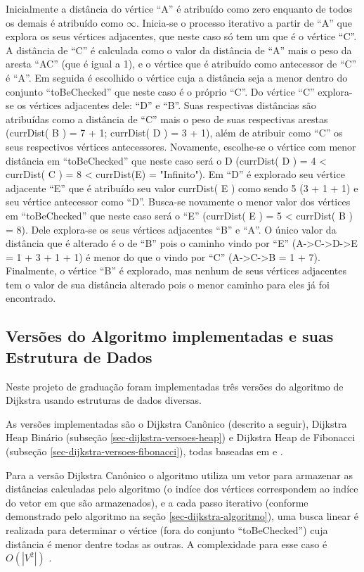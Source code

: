 Inicialmente a distância do vértice ``A'' é atribuído como zero enquanto de todos os demais é atribuído como $\infty$. Inicia-se o processo iterativo a partir de ``A'' que explora os seus vértices adjacentes, que neste caso só tem um que é o vértice ``C''. A distância de ``C'' é calculada como o valor da distância de ``A'' mais o peso da aresta ``AC'' (que é igual a 1), e o vértice que é atribuído como antecessor de ``C'' é ``A''. Em seguida é escolhido o vértice cuja a distância seja a menor dentro do conjunto ``toBeChecked'' que neste caso é o próprio ``C''. Do vértice ``C'' explora-se os vértices adjacentes dele: ``D'' e ``B''. Suas respectivas distâncias são atribuídas como a distância de ``C'' mais o peso de suas respectivas arestas (currDist( B ) = 7 + 1; currDist( D ) = 3 + 1), além de atribuir como ``C'' os seus respectivos vértices antecessores. Novamente, escolhe-se o vértice com menor distância em ``toBeChecked'' que neste caso será o D (currDist( D ) = 4 < currDist( C ) = 8 < currDist(E) = "Infinito"). Em ``D'' é explorado seu vértice adjacente ``E'' que é atribuído seu valor currDist( E ) como sendo 5 (3 + 1 + 1) e seu vértice antecessor como ``D''. Busca-se novamente o menor valor dos vértices em ``toBeChecked'' que neste caso será o ``E'' (currDist( E ) = 5 < currDist( B ) = 8). Dele explora-se os seus vértices adjacentes ``B'' e ``A''. O único valor da distância que é alterado é o de ``B'' pois o caminho vindo por ``E'' (A->C->D->E = 1 + 3 + 1 + 1) é menor do que o vindo por ``C''  (A->C->B = 1 + 7). Finalmente, o vértice ``B'' é explorado, mas nenhum de seus vértices adjacentes tem o valor de sua distância alterado pois o menor caminho para eles já foi encontrado.

\subsection{Versões do Algoritmo implementadas e suas Estrutura de Dados}
\label{sec-dijkstra-versoes}
Neste projeto de graduação foram implementadas três versões do algoritmo de Dijkstra usando estruturas de dados diversas.

As versões implementadas são o Dijkstra Canônico (descrito a seguir), Dijkstra Heap Binário (subseção \ref{sec-dijkstra-versoes-heap}) e Dijkstra Heap de Fibonacci (subseção \ref{sec-dijkstra-versoes-fibonacci}), todas baseadas em  e .

Para a versão Dijkstra Canônico o algoritmo utiliza um vetor para armazenar as distâncias calculadas pelo algoritmo (o indíce dos vértices correspondem ao indíce do vetor em que são armazenados), e a cada passo iterativo (conforme demonstrado pelo algoritmo na seção \ref{sec-dijkstra-algoritmo}), uma busca linear é realizada para determinar o vértice (fora do conjunto ``toBeChecked'') cuja distância é menor dentre todas as outras. A complexidade para esse caso é $O(|V^{2}|)$ \cite{drozdek2012data}.

